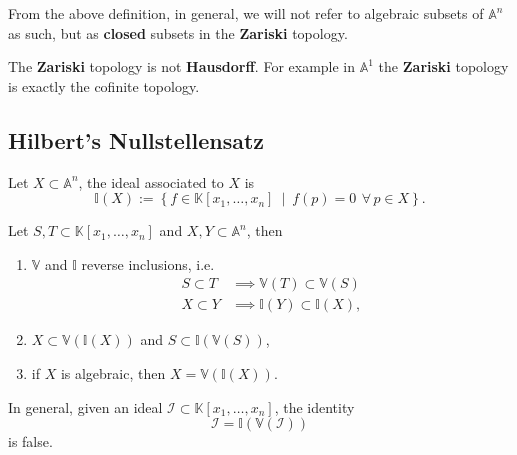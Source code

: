 From the above definition, in general, we will not refer to algebraic subsets of $\mathbb{A}^n$ as such, but as \textbf{closed} subsets in the \textbf{Zariski} topology.

\begin{rem}
	The \textbf{Zariski} topology is not \textbf{Hausdorff}.
	For example in $\mathbb{A}^1$ the \textbf{Zariski} topology is exactly the cofinite topology.
\end{rem}

\subsection{Hilbert's Nullstellensatz}
\begin{defn}
	Let $X \subset \mathbb{A}^n$, the ideal associated to $X$ is
	\begin{equation}
		\mathbb{I}(X) := \left\{ f \in \mathbb{K}\left[x_1, \ldots, x_n \right] \ \middle|\ f(p) = 0\ \,\forall\, p \in X \right\}
	.\end{equation} 
\end{defn}

\begin{lem}
	Let $S, T \subset \mathbb{K}\left[x_1, \ldots, x_n \right]$ and $X, Y \subset \mathbb{A}^n$, then
	\begin{enumerate}
		\item $\mathbb{V}$ and $\mathbb{I}$ reverse inclusions, i.e.
			\begin{align}
				S \subset T &\implies \mathbb{V}(T) \subset \mathbb{V}(S)\\
				X \subset Y &\implies \mathbb{I}(Y) \subset \mathbb{I}(X)
			,\end{align} 
		\item $X \subset \mathbb{V}(\mathbb{I}(X))$ and $S \subset \mathbb{I}\left( \mathbb{V}(S) \right)$,
		\item if $X$ is algebraic, then $X = \mathbb{V}\left(\mathbb{I}(X)\right)$.
	\end{enumerate}
\end{lem} 

\begin{rem}
	In general, given an ideal $\mathcal{I} \subset \mathbb{K}\left[x_1, \ldots, x_n \right]$, the identity
	\begin{equation}
		\mathcal{I} = \mathbb{I}\left( \mathbb{V}\left(\mathcal{I}\right) \right)
	\end{equation} 
	is false.
\end{rem}

